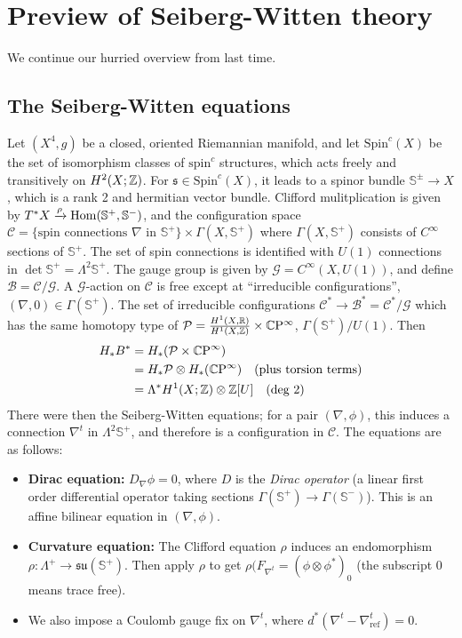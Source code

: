 \section{Preview of Seiberg-Witten theory} 
We continue our hurried overview from last time.
\subsection{The Seiberg-Witten equations}
Let $(X^4,g)$ be a closed, oriented Riemannian manifold, and let $\mathrm{Sp in}^c(X)$ be the set of isomorphism classes of $\mathrm{sp in}^c$ structures, which acts freely and transitively on $H^2(X;\mathbb{Z})$. For $\mathfrak s \in  \mathrm{Sp in}^c(X)$, it leads to a spinor bundle $\mathbb S ^{\pm}\to X$, which is a rank 2 and hermitian vector bundle. Clifford mulitplication is given by $T^*X \xrightarrow{\rho} \operatorname{Hom}(\mathbb S^+, \mathbb S^-)$, and the configuration space $\mathcal C = \{ \text{spin connections } \nabla \text{ in } \mathbb S^+\} \times  \Gamma (X,\mathbb S^+)$ where $\Gamma(X,\mathbb S^+)$ consists of $C ^{\infty}$ sections of $\mathbb S^+$. The set of spin connections is identified with $U(1)$ connections in $\det \mathbb S^+ = \Lambda^2 \mathbb S^+ $. The gauge group is given by $\mathcal G= C^{\infty}(X, U(1))$, and define $\mathcal B = \mathcal C / \mathcal G$.  A $\mathcal G$-action on $\mathcal C$ is free except at ``irreducible configurations'', $(\nabla,0) \in \Gamma(\mathbb S^+)$. The set of irreducible configurations $\mathcal C^* \to \mathcal B^* = \mathcal C^* / \mathcal G$ which has the same homotopy type of $\mathcal P = \frac{H^1(X,\mathbb{R})}{H^1(X,\mathbb{Z})}\times \mathbb{C} \mathrm{P }^{\infty}$, $\Gamma(\mathbb S^+) / U(1)$. Then 
\begin{align*}
    H_*B^* &= H_*(\mathcal P \times \mathbb{C} \mathrm{P}^{\infty})\\
           &= H_*\mathcal P \otimes H_* (\mathbb{C} \mathrm{P}^{\infty}) \quad \text{(plus torsion terms)} \\
           &= \Lambda^* H^1(X;\mathbb{Z}) \otimes \mathbb{Z}[U] \quad \text{(deg 2)} 
\end{align*}
There were then the Seiberg-Witten equations; for a pair $(\nabla,\phi)$, this induces a connection $\nabla^t $ in $\Lambda^2\mathbb S^+$, and therefore is a configuration in $\mathcal C$. The equations are as follows:
\begin{itemize}
\setlength\itemsep{-.2em}
    \item \textbf{Dirac equation:} $D_{\nabla}\phi = 0$, where $D$ is the \emph{Dirac operator} (a linear first order differential operator taking sections $\Gamma(\mathbb S^+) \to \Gamma(\mathbb S^-)$). This is an affine bilinear equation in $(\nabla,\phi)$.
    \item \textbf{Curvature equation:} The Clifford equation $\rho$ induces an endomorphism $\rho \colon \Lambda^+ \to \mathfrak{su}  (\mathbb S^+)$. Then apply $\rho $ to get $\rho(F_{\nabla^t} = (\phi \otimes \phi^*)_0$ (the subscript 0 means trace free).
    \item We also impose a Coulomb gauge fix on $\nabla^t$, where $d^*(\nabla^t - \nabla^t _{\mathrm{ref}}) = 0$. 
\end{itemize}
